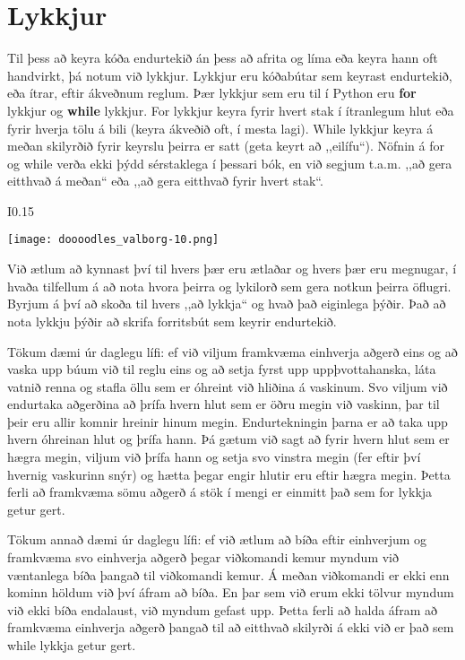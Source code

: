 
\chapter{Lykkjur}\label{k:lykkjur}
Til þess að keyra kóða endurtekið án þess að afrita og líma eða keyra hann oft handvirkt, þá notum við lykkjur.
Lykkjur eru kóðabútar sem keyrast endurtekið, eða ítrar, eftir ákveðnum reglum.
Þær lykkjur sem eru til í Python eru \textbf{for} lykkjur og \textbf{while} lykkjur.
For lykkjur keyra fyrir hvert stak í ítranlegum hlut eða fyrir hverja tölu á bili (keyra ákveðið oft, í mesta lagi).
While lykkjur keyra á meðan skilyrðið fyrir keyrslu þeirra er satt (geta keyrt að ,,eilífu“).
Nöfnin á for og while verða ekki þýdd sérstaklega í þessari bók, en við segjum t.a.m. ,,að gera eitthvað á meðan“ eða ,,að gera eitthvað fyrir hvert stak“.
\begin{wrapfigure}{I}{0.15\textwidth} %
	\begin{center}
		\texttt{[image: doooodles\_valborg-10.png]}
	\end{center}
\end{wrapfigure}
Við ætlum að kynnast því til hvers þær eru ætlaðar og hvers þær eru megnugar, í hvaða tilfellum á að nota hvora þeirra og lykilorð sem gera notkun þeirra öflugri.
Byrjum á því að skoða til hvers ,,að lykkja“ og hvað það eiginlega þýðir.
Það að nota lykkju þýðir að skrifa forritsbút sem keyrir endurtekið.

Tökum dæmi úr daglegu lífi: ef við viljum framkvæma einhverja aðgerð eins og að vaska upp búum við til reglu eins og að setja fyrst upp uppþvottahanska, láta vatnið renna og stafla öllu sem er óhreint við hliðina á vaskinum. 
Svo viljum við endurtaka aðgerðina að þrífa hvern hlut sem er öðru megin við vaskinn, þar til þeir eru allir komnir hreinir hinum megin.
Endurtekningin þarna er að taka upp hvern óhreinan hlut og þrífa hann.
Þá gætum við sagt að fyrir hvern hlut sem er hægra megin, viljum við þrífa hann og setja svo vinstra megin (fer eftir því hvernig vaskurinn snýr) og hætta þegar engir hlutir eru eftir hægra megin.
Þetta ferli að framkvæma sömu aðgerð á stök í mengi er einmitt það sem for lykkja getur gert.

Tökum annað dæmi úr daglegu lífi: ef við ætlum að bíða eftir einhverjum og framkvæma svo einhverja aðgerð þegar viðkomandi kemur myndum við væntanlega bíða þangað til viðkomandi kemur.
Á meðan viðkomandi er ekki enn kominn höldum við því áfram að bíða.
En þar sem við erum ekki tölvur myndum við ekki bíða endalaust, við myndum gefast upp.
Þetta ferli að halda áfram að framkvæma einhverja aðgerð þangað til að eitthvað skilyrði á ekki við er það sem while lykkja getur gert.

